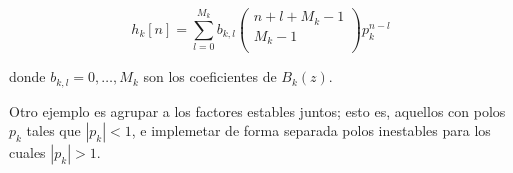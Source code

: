          \begin{equation}
           h_{k}[n] = \sum_{l=0}^{M_k}{b_{k,l}}
           \left(
           \begin{matrix}
                    n + l + M_{k} -1 \\
                    M_{k} - 1 \\
            \end{matrix}
           \right)
                p_{k}^{n-l}
              \end{equation}

              donde $b_{k,l}=0,\ldots ,M_k$ son los coeficientes de $B_k(z)$.

              Otro ejemplo es agrupar a los factores estables juntos; esto es, aquellos con polos $p_k$ tales que $|p_k|<1$, e implemetar de forma separada polos inestables para los cuales $|p_k|>1$.


